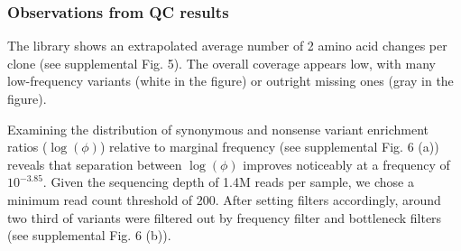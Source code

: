 \documentclass{article}
\begin{document}
\subsubsection{Observations from QC results}

The library shows an extrapolated average number of 2 amino acid changes per clone (see supplemental Fig. 5). The overall coverage appears low, with many low-frequency variants (white in the figure) or outright missing ones (gray in the figure).



Examining the distribution of synonymous and nonsense variant enrichment ratios ($\log(\phi)$) relative to marginal frequency (see supplemental Fig. 6 (a)) reveals that separation between $\log(\phi)$ improves noticeably at a frequency of $10^{-3.85}$. Given the sequencing depth of 1.4M reads per sample, we chose a minimum read count threshold of 200. After setting filters accordingly, around two third of variants were filtered out by frequency filter and bottleneck filters (see supplemental Fig. 6 (b)). 

\end{document}
